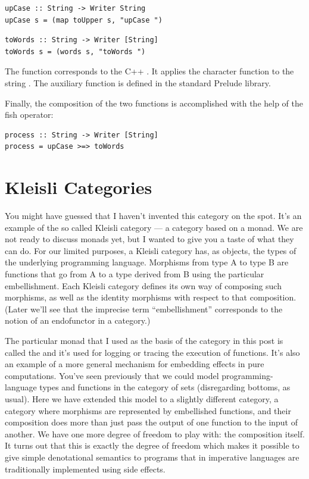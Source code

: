 \begin{Verbatim}[commandchars=\\\{\}]
upCase :: String -> Writer String
upCase s = (map toUpper s, "upCase ")
\end{Verbatim}

\begin{Verbatim}[commandchars=\\\{\}]
toWords :: String -> Writer [String]
toWords s = (words s, "toWords ")
\end{Verbatim}
The function  corresponds to the C++ . It
applies the character function  to the string
. The auxiliary function  is defined in the
standard Prelude library.

Finally, the composition of the two functions is accomplished with the
help of the fish operator:

\begin{Verbatim}[commandchars=\\\{\}]
process :: String -> Writer [String]
process = upCase >=> toWords
\end{Verbatim}

\section{Kleisli Categories}\label{kleisli-categories}

You might have guessed that I haven't invented this category on the
spot. It's an example of the so called Kleisli category --- a category
based on a monad. We are not ready to discuss monads yet, but I wanted
to give you a taste of what they can do. For our limited purposes, a
Kleisli category has, as objects, the types of the underlying
programming language. Morphisms from type A to type B are functions that
go from A to a type derived from B using the particular embellishment.
Each Kleisli category defines its own way of composing such morphisms,
as well as the identity morphisms with respect to that composition.
(Later we'll see that the imprecise term ``embellishment'' corresponds
to the notion of an endofunctor in a category.)

The particular monad that I used as the basis of the category in this
post is called the  and it's used for logging or
tracing the execution of functions. It's also an example of a more
general mechanism for embedding effects in pure computations. You've
seen previously that we could model programming-language types and
functions in the category of sets (disregarding bottoms, as usual). Here
we have extended this model to a slightly different category, a category
where morphisms are represented by embellished functions, and their
composition does more than just pass the output of one function to the
input of another. We have one more degree of freedom to play with: the
composition itself. It turns out that this is exactly the degree of
freedom which makes it possible to give simple denotational semantics to
programs that in imperative languages are traditionally implemented
using side effects.

